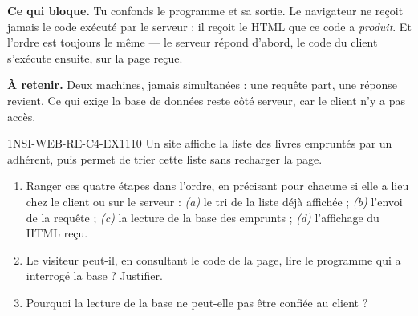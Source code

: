 

\textbf{Ce qui bloque.} Tu confonds le programme et sa sortie. Le navigateur ne reçoit jamais
le code exécuté par le serveur : il reçoit le HTML que ce code a \emph{produit}. Et l'ordre est
toujours le même — le serveur répond d'abord, le code du client s'exécute ensuite, sur la page
reçue.

\textbf{À retenir.} Deux machines, jamais simultanées : une requête part, une réponse revient.
Ce qui exige la base de données reste côté serveur, car le client n'y a pas accès.

\begin{exercice}{1NSI-WEB-RE-C4-EX1}{1}{10}
Un site affiche la liste des livres empruntés par un adhérent, puis permet de trier cette
liste sans recharger la page.
\begin{enumerate}
  \item Ranger ces quatre étapes dans l'ordre, en précisant pour chacune si elle a lieu chez le
        client ou sur le serveur : \emph{(a)} le tri de la liste déjà affichée ;
        \emph{(b)} l'envoi de la requête ; \emph{(c)} la lecture de la base des emprunts ;
        \emph{(d)} l'affichage du HTML reçu.
  \item Le visiteur peut-il, en consultant le code de la page, lire le programme qui a interrogé
        la base ? Justifier.
  \item Pourquoi la lecture de la base ne peut-elle pas être confiée au client ?
\end{enumerate}
\end{exercice}
